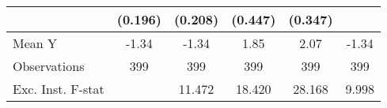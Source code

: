 {\begin{tabular}{l*{5}{c}}
            &     (0.196)         &     (0.208)         &     (0.447)         &     (0.347)         &                     \\
\midrule
Mean Y      &       -1.34         &       -1.34         &        1.85         &        2.07         &       -1.34         \\
Observations&         399         &         399         &         399         &         399         &         399         \\
Exc. Inst. F-stat&                     &      11.472         &      18.420         &      28.168         &       9.998         \\
\bottomrule
\end{tabular}
}
